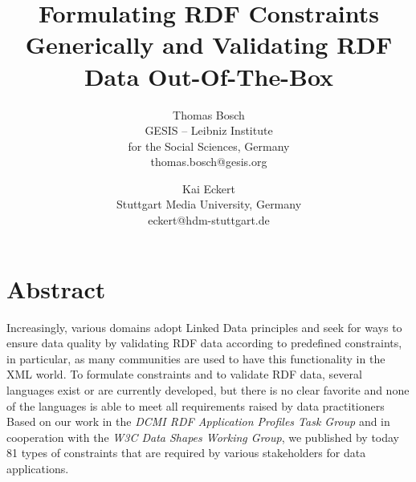 \documentclass[a4paper,fontsize=11pt]{scrartcl}
\date{}
\newcommand{\tb}[1]{\todo[size=\small, color=green!40]{\textbf{Thomas:} #1}}
\newcommand{\ms}[1]{\texttt{#1}}
\begin{document}
\title{\vspace{-1em}Formulating RDF Constraints Generically and Validating RDF Data Out-Of-The-Box}

\author{Thomas Bosch\\GESIS – Leibniz Institute \\for the Social Sciences, Germany\\thomas.bosch@gesis.org \and Kai Eckert\\Stuttgart Media University, Germany\\eckert@hdm-stuttgart.de}

\maketitle
\vspace{-3em}
\section*{Abstract}
Increasingly, various domains adopt Linked Data principles
and seek for ways to ensure data quality by validating RDF data according to predefined constraints,
in particular, as many communities are used to have this functionality in the XML world.
To formulate constraints and to validate RDF data, several languages exist or are currently developed,
but there is no clear favorite and none of the languages is able to meet all requirements raised by data practitioners
Based on our work in the \emph{DCMI RDF Application Profiles Task Group} and in cooperation with the \emph{W3C Data Shapes Working Group}, 
we published by today 81 types of constraints that are required by various stakeholders for data applications.
\end{document}
